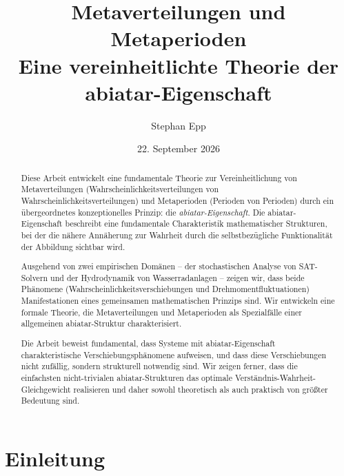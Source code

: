 \documentclass[a4paper,12pt]{article}
\title{\textbf{Metaverteilungen und Metaperioden} \\ Eine vereinheitlichte Theorie der abiatar-Eigenschaft}
\author{Stephan Epp}
\date{22. September 2026}
\theoremstyle{definition}
\begin{document}
	
\maketitle

\begin{abstract}
Diese Arbeit entwickelt eine fundamentale Theorie zur Vereinheitlichung von Metaverteilungen (Wahrscheinlichkeitsverteilungen von Wahrscheinlichkeitsverteilungen) und Metaperioden (Perioden von Perioden) durch ein übergeordnetes konzeptionelles Prinzip: die \textit{abiatar-Eigenschaft}. Die abiatar-Eigenschaft beschreibt eine fundamentale Charakteristik mathematischer Strukturen, bei der die nähere Annäherung zur Wahrheit durch die selbstbezügliche Funktionalität der Abbildung sichtbar wird.

Ausgehend von zwei empirischen Domänen -- der stochastischen Analyse von SAT-Solvern und der Hydrodynamik von Wasserradanlagen -- zeigen wir, dass beide Phänomene (Wahrscheinlichkeitsverschiebungen und Drehmomentfluktuationen) Manifestationen eines gemeinsamen mathematischen Prinzips sind. Wir entwickeln eine formale Theorie, die Metaverteilungen und Metaperioden als Spezialfälle einer allgemeinen abiatar-Struktur charakterisiert.

Die Arbeit beweist fundamental, dass Systeme mit abiatar-Eigenschaft charakteristische Verschiebungsphänomene aufweisen, und dass diese Verschiebungen nicht zufällig, sondern strukturell notwendig sind. Wir zeigen ferner, dass die einfachsten nicht-trivialen abiatar-Strukturen das optimale Verständnis-Wahrheit-Gleichgewicht realisieren und daher sowohl theoretisch als auch praktisch von größter Bedeutung sind.
\end{abstract}

\tableofcontents
\newpage

\section{Einleitung}
\end{document}
